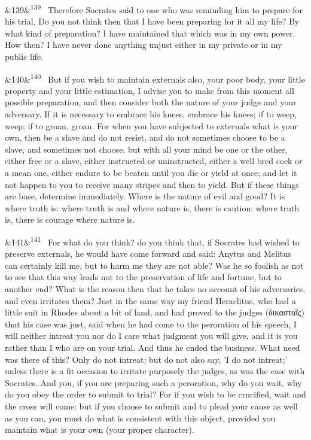 \documentclass[12pt]{article}
\newcommand{\para}[1][]{\par\noindent\ifx&#1&\else\textsuperscript{\footnotesize #1}~\fi}
\begin{document}
\para[139] Therefore Socrates said to one who was reminding him to prepare for his trial, Do you not think then that I have been preparing for it all my life? By what kind of preparation? I have maintained that which was in my own power. How then? I have never done anything unjust either in my private or in my public life.

\para[140] But if you wish to maintain externals also, your poor body, your little property and your little estimation, I advise you to make from this moment all possible preparation, and then consider both the nature of your judge and your adversary. If it is necessary to embrace his knees, embrace his knees; if to weep, weep; if to groan, groan. For when you have subjected to externals what is your own, then be a slave and do not resist, and do not sometimes choose to be a slave, and sometimes not choose, but with all your mind be one or the other, either free or a slave, either instructed or uninstructed, either a well bred cock or a mean one, either endure to be beaten until you die or yield at once; and let it not happen to you to receive many stripes and then to yield. But if these things are base, determine immediately. Where is the nature of evil and good? It is where truth is: where truth is and where nature is, there is caution: where truth is, there is courage where nature is.

\para[141] For what do you think? do you think that, if Socrates had wished to preserve externals, he would have come forward and said: Anytus and Melitus can certainly kill me, but to harm me they are not able? Was he so foolish as not to see that this way leads not to the preservation of life and fortune, but to another end? What is the reason then that he takes no account of his adversaries, and even irritates them? Just in the same way my friend Heraclitus, who had a little suit in Rhodes about a bit of land, and had proved to the judges (δικασταῖς) that his case was just, said when he had come to the peroration of his speech, I will neither intreat you nor do I care what judgment you will give, and it is you rather than I who are on your trial. And thus he ended the business. What need was there of this? Only do not intreat; but do not also say, 'I do not intreat;' unless there is a fit occasion to irritate purposely the judges, as was the case with Socrates. And you, if you are preparing such a peroration, why do you wait, why do you obey the order to submit to trial? For if you wish to be crucified, wait and the cross will come: but if you choose to submit and to plead your cause as well as you can, you must do what is consistent with this object, provided you maintain what is your own (your proper character).
\end{document}
